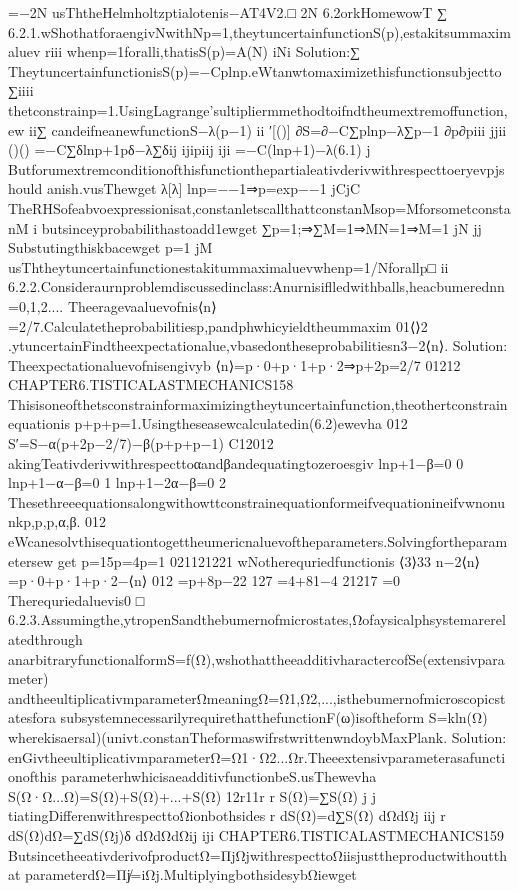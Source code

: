 {{{{{{{{{{=−2N
usThtheHelmholtzptialotenis−AT4V2.□
2N
6.2orkHomewowT
∑
6.2.1.wShothatforaengivNwithNp=1,theytuncertainfunctionS({p}),estakitsummaximaluev
riii
whenp=1foralli,thatisS({p})=A(N)
iNi
Solution:∑
TheytuncertainfunctionisS({p})=−Cplnp.eWtanwtomaximizethisfunctionsubjectto
∑iiii
thetconstrainp=1.UsingLagrange’sultipliermmethodtoifndtheumextremoffunction,ew
ii∑
candeifneanewfunctionS−λ(p−1)
ii
′[()]
∂S=∂−C∑plnp−λ∑p−1
∂p∂piii
jjii
()()
=−C∑δlnp+1pδ−λ∑δij
ijipiij
iji
=−C(lnp+1)−λ(6.1)
j
Butforumextremconditionofthisfunctionthepartialeativderivwithrespecttoeryevpjshould
anish.vusThewget
λ[λ]
lnp=−−1⇒p=exp−−1
jCjC
TheRHSofeabvoexpressionisat,constanletscallthattconstanMsop=MforsometconstanM
i
butsinceyprobabilithastoadd1ewget
∑p=1;⇒∑M=1⇒MN=1⇒M=1
jN
jj
Substutingthiskbacewget
p=1
jM
usThtheytuncertainfunctionestakitummaximaluevwhenp=1/Nforallp□
ii
6.2.2.Consideraurnproblemdiscussedinclass:Anurnisiflledwithballs,heacbumerednn=0,1,2....
Theeragevaaluevofnis⟨n⟩=2/7.Calculatetheprobabilitiesp,pandphwhicyieldtheummaxim
01⟨⟩2
.ytuncertainFindtheexpectationalue,vbasedontheseprobabilitiesn3−2⟨n⟩.
Solution:
Theexpectationaluevofnisengivyb
⟨n⟩=p·0+p·1+p·2⇒p+2p=2/7
01212
CHAPTER6.TISTICALASTMECHANICS158
Thisisoneofthetsconstrainformaximizingtheytuncertainfunction,theothertconstrainequationis
p+p+p=1.Usingtheseasewcalculatedin(6.2)ewevha
012
S′=S−α(p+2p−2/7)−β(p+p+p−1)
C12012
akingTeativderivwithrespecttoαandβandequatingtozeroesgiv
lnp+1−β=0
0
lnp+1−α−β=0
1
lnp+1−2α−β=0
2
Thesethreeequationsalongwithowttconstrainequationformeifvequationineifvwnonunkp,p,p,α,β.
012
eWcanesolvthisequationtogettheumericnaluevoftheparameters.Solvingfortheparametersew
get
p=15p=4p=1
021121221
wNotherequriedfunctionis
⟨3⟩33
n−2⟨n⟩=p·0+p·1+p·2−⟨n⟩
012
=p+8p−22
127
=4+81−4
21217
=0
Therequriedaluevis0
□
6.2.3.Assumingthe,ytropenSandthebumernofmicrostates,Ωofaysicalphsystemarerelatedthrough
anarbitraryfunctionalformS=f(Ω),wshothattheeadditivharactercofSe(extensivparameter)
andtheeultiplicativmparameterΩmeaningΩ=Ω1,Ω2,...,isthebumernofmicroscopicstatesfora
subsystemnecessarilyrequirethatthefunctionF(ω)isoftheform
S=kln(Ω)
wherekisaersal)(univt.constanTheformaswifrstwrittenwndoybMaxPlank.
Solution:
enGivtheeultiplicativmparameterΩ=Ω1·Ω2...Ωr.Theeextensivparameterasafunctionofthis
parameterhwhicisaeadditivfunctionbeS.usThewevha
S(Ω·Ω...Ω)=S(Ω)+S(Ω)+...+S(Ω)
12r11r
r
S(Ω)=∑S(Ω)
j
j
tiatingDifferenwithrespecttoΩionbothsides
r
dS(Ω)=d∑S(Ω)
dΩdΩj
iij
r
dS(Ω)dΩ=∑dS(Ωj)δ
dΩdΩdΩij
iji
CHAPTER6.TISTICALASTMECHANICS159
ButsincetheeativderivofproductΩ=ΠjΩjwithrespecttoΩiisjusttheproductwithoutthat
parameterdΩ=Πj̸=iΩj.MultiplyingbothsidesybΩiewget
}}}}}}}}}}
